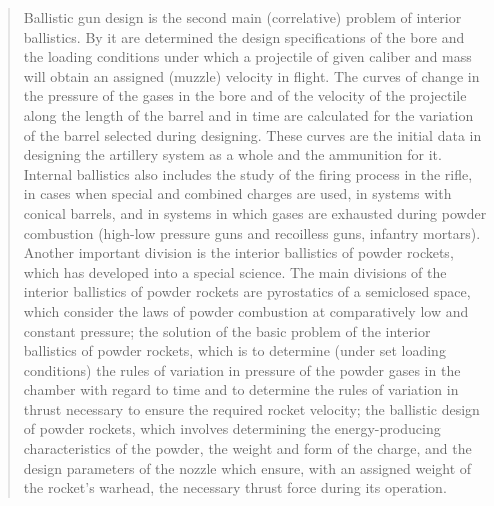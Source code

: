 \begin{quotation}
Ballistic gun design is the second main (correlative) problem of
interior ballistics. By it are determined the design specifications of
the bore and the loading conditions under which a projectile of given
caliber and mass will obtain an assigned (muzzle) velocity in
flight. The curves of change in the pressure of the gases in the bore
and of the velocity of the projectile along the length of the barrel
and in time are calculated for the variation of the barrel selected
during designing. These curves are the initial data in designing the
artillery system as a whole and the ammunition for it. Internal
ballistics also includes the study of the firing process in the rifle,
in cases when special and combined charges are used, in systems with
conical barrels, and in systems in which gases are exhausted during
powder combustion (high-low pressure guns and recoilless guns,
infantry mortars). Another important division is the interior
ballistics of powder rockets, which has developed into a special
science. The main divisions of the interior ballistics of powder
rockets are pyrostatics of a semiclosed space, which consider the laws
of powder combustion at comparatively low and constant pressure; the
solution of the basic problem of the interior ballistics of powder
rockets, which is to determine (under set loading conditions) the
rules of variation in pressure of the powder gases in the chamber with
regard to time and to determine the rules of variation in thrust
necessary to ensure the required rocket velocity; the ballistic design
of powder rockets, which involves determining the energy-producing
characteristics of the powder, the weight and form of the charge, and
the design parameters of the nozzle which ensure, with an assigned
weight of the rocket’s warhead, the necessary thrust force during its
operation.


\end{quotation}
